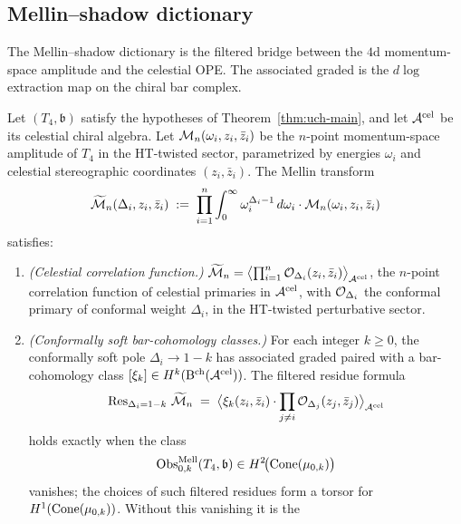 \subsection{Mellin--shadow dictionary}
\label{subsec:uch-mellin}

The Mellin--shadow dictionary is the filtered bridge between the
$4$d momentum-space amplitude and the celestial OPE. The associated
graded is the $d\log$ extraction map on the chiral bar complex.

\begin{proposition}
\label{prop:uch-mellin-shadow}
Let $(T_4,\mathfrak b)$ satisfy the hypotheses of
Theorem~\ref{thm:uch-main}, and let $\mathcal A^{\mathrm{cel}}$ be its
celestial chiral algebra. Let $\mathcal M_n(\omega_i, z_i, \bar z_i)$ be
the $n$-point momentum-space amplitude of $T_4$ in the HT-twisted
sector, parametrized by energies $\omega_i$ and celestial
stereographic coordinates $(z_i, \bar z_i)$. The Mellin transform
\begin{equation}
\label{eq:uch-mellin}
\widetilde{\mathcal M}_n(\Delta_i, z_i, \bar z_i)
\;:=\;
\prod_{i=1}^n \int_0^\infty \omega_i^{\Delta_i - 1}\,d\omega_i\cdot
\mathcal M_n(\omega_i, z_i, \bar z_i)
\end{equation}
satisfies:
\begin{enumerate}[label=\textup{(\roman*)}]
\item \emph{(Celestial correlation function.)}
$\widetilde{\mathcal M}_n = \bigl\langle \prod_{i=1}^n \mathcal O_{\Delta_i}(z_i, \bar z_i)
\bigr\rangle_{\mathcal A^{\mathrm{cel}}}$,
the $n$-point correlation function of celestial primaries in
$\mathcal A^{\mathrm{cel}}$, with $\mathcal O_{\Delta_i}$ the conformal primary of
conformal weight $\Delta_i$, in the HT-twisted perturbative sector.
\item \emph{(Conformally soft bar-cohomology classes.)}
For each integer $k \geq 0$, the conformally soft pole
$\Delta_i \to 1 - k$ has associated graded paired with a
bar-cohomology class
$[\xi_k] \in H^k(\mathrm B^{\mathrm{ch}}(\mathcal A^{\mathrm{cel}}))$.
The filtered residue formula
\[
\operatorname{Res}_{\Delta_i = 1-k}\,\widetilde{\mathcal M}_n
\;=\;
\bigl\langle \xi_k(z_i, \bar z_i)\cdot
\prod_{j \neq i} \mathcal O_{\Delta_j}(z_j, \bar z_j)
\bigr\rangle_{\mathcal A^{\mathrm{cel}}}
\]
holds exactly when the class
\[
\operatorname{Obs}^{\mathrm{Mell}}_{0,k}(T_4,\mathfrak b)
\in H^2\!\bigl(\operatorname{Cone}(\mu_{0,k})\bigr)
\]
vanishes; the choices of such filtered residues form a torsor for
$H^1(\operatorname{Cone}(\mu_{0,k}))$. Without this vanishing it is the

\end{enumerate}
\end{proposition}
